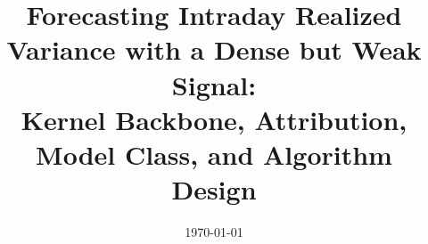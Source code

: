 \documentclass[12pt]{article}
\title{Forecasting Intraday Realized Variance with a Dense but Weak Signal:\\
Kernel Backbone, Attribution, Model Class, and Algorithm Design}
\author{}
\date{\today}
\begin{document}
\maketitle

\begin{abstract}

\end{abstract}



















\end{document}
